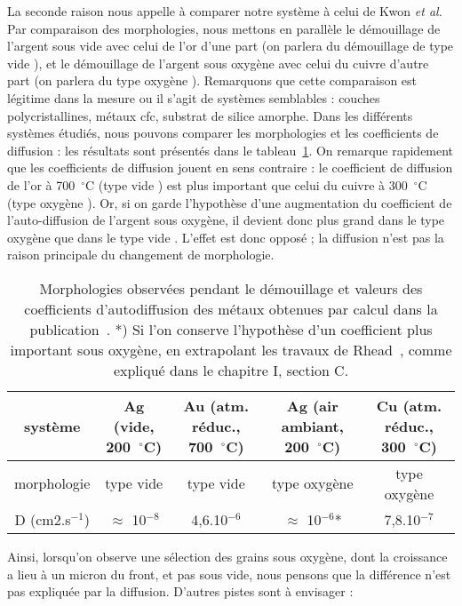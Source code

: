 {{La seconde raison nous appelle à comparer notre système à celui de Kwon \textit{et al.}~\cite{kwon2003comparison} Par comparaison des morphologies, nous mettons en parallèle le démouillage de l’argent sous vide avec celui de l’or d’une part (on parlera du démouillage de type \og vide \fg), et le démouillage de l’argent sous oxygène avec celui du cuivre d’autre part (on parlera du type \og oxygène \fg). Remarquons que cette comparaison est légitime dans la mesure ou il s’agit de systèmes semblables : couches polycristallines, métaux cfc, substrat de silice amorphe. Dans les différents systèmes étudiés, nous pouvons comparer les morphologies et les coefficients de diffusion : les résultats sont présentés dans le tableau~\ref{tDiffusion}. On remarque rapidement que les coefficients de diffusion jouent en sens contraire : le coefficient de diffusion de l’or à 700~$^\circ$C (type \og vide \fg) est plus important que celui du cuivre à 300~$^\circ$C (type \og oxygène \fg). Or, si on garde l’hypothèse d’une augmentation du coefficient de l’auto-diffusion de l’argent sous oxygène, il devient donc plus grand dans le type \og oxygène \fg{} que dans le type \og vide \fg. L’effet est donc opposé ; la diffusion n’est pas la raison principale du changement de morphologie.\par 
{}
\begin{table}
\centering
\begin{tabular}{ccccc}
\hline
système & Ag (vide, 200~$^\circ$C) & Au (atm. réduc., 700~$^\circ$C) & Ag (air ambiant, 200~$^\circ$C) & Cu (atm. réduc., 300~$^\circ$C)\\
\hline
morphologie & type vide & type vide & type oxygène & type oxygène\\
D (cm2.s$^{-1}$) &  $\approx$ 10$^{-8}$ & 4,6.10$^{-6}$ & $\approx$ 10$^{-6}$* & 7,8.10$^{-7}$\\
\end{tabular}
\caption{Morphologies observées pendant le démouillage et valeurs des coefficients d’autodiffusion des métaux obtenues par calcul dans la publication~\cite{agrawal2002predicting}. *) Si l’on conserve l’hypothèse d’un coefficient plus important sous oxygène, en extrapolant les travaux de Rhead~\cite{rhead1963surface}, comme expliqué dans le chapitre I, section C.}
\label{tDiffusion}
\end{table}
Ainsi, lorsqu’on observe une sélection des grains sous oxygène, dont la croissance a lieu à un micron du front, et pas sous vide, nous pensons que la différence n’est pas expliquée par la diffusion. D’autres pistes sont à envisager :
}}
